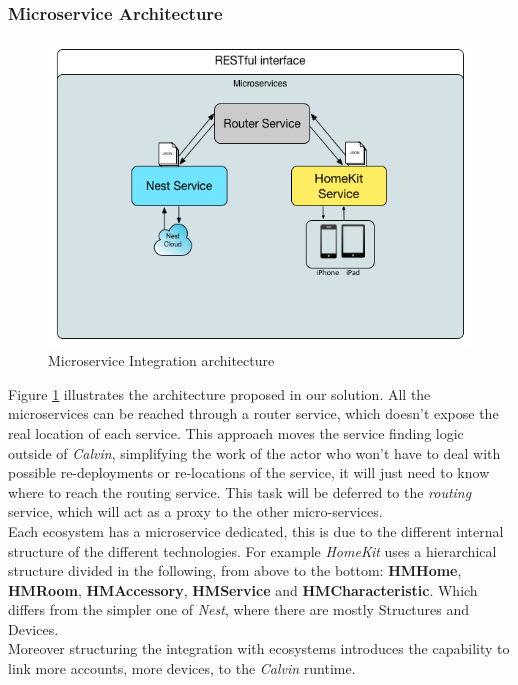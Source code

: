 \subsubsection{Microservice Architecture}


\begin{figure}[h]
\caption{Microservice Integration architecture}
\label{fig:test-arch}
\centering
\includegraphics[scale=0.65]{test-arch.png}
\end{figure}

Figure \ref{fig:test-arch} illustrates the architecture proposed in our solution.
All the microservices can be reached through a router service, which doesn't expose
the real location of each service. This approach moves the service finding logic outside
of \textit{Calvin}, simplifying the work of the actor who won't have to deal with possible
re-deployments or re-locations of the service, it will just need to know where to reach the
routing service. This task will be deferred to the \textit{routing} service, which will act
as a proxy to the other micro-services.\\
Each ecosystem has a microservice dedicated, this is due to the different internal structure of the
different technologies. For example \textit{HomeKit} uses a hierarchical structure divided in the following,
from above to the bottom: \textbf{HMHome}, \textbf{HMRoom}, \textbf{HMAccessory}, \textbf{HMService} and \textbf{HMCharacteristic}.
Which differs from the simpler one of \textit{Nest}, where there are mostly Structures and Devices.\\
Moreover structuring the integration with ecosystems introduces the capability to link more accounts, more devices,
to the \textit{Calvin} runtime.

